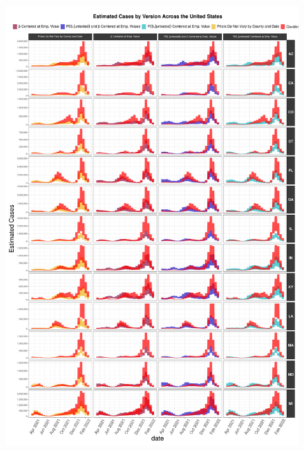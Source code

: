 \documentclass[12pt,twoside]{smiththesis}
\begin{document}
\begin{figure}
\includegraphics[width=1\linewidth]{figure/state_comp_covidestim1} \caption{\label{fig:state-results-1}}\label{fig:unnamed-chunk-78}
\end{figure}
\end{document}
